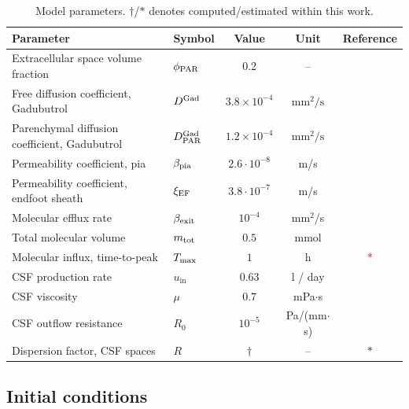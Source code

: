 \documentclass[fleqn,10pt]{wlscirep}
\newcommand{\fixme}[1]{\textcolor{red}{#1}}
\begin{document}
\begin{table}
  \begin{center}
    \begin{tabular}{ll|ccc}
      \toprule
      Parameter& Symbol & Value & Unit& Reference\\
      \midrule
      Extracellular space volume fraction & $\phi_{\rm PAR}$ & 0.2 & -- & \cite{nicholson1981ion} \\
      Free diffusion coefficient, Gadubutrol & $D^{\rm Gad}$ & $3.8 \times 10^{-4}$& $\text{mm}^2/\text{s}$ & \cite{valnes2020apparent}\\
      Parenchymal diffusion coefficient, Gadubutrol & $D^{\rm Gad}_{\rm PAR}$ & $1.2 \times 10^{-4}$ & $\text{mm}^2/\text{s}$  & \cite{hornkjol2022csf} \\
      Permeability coefficient, pia & $\beta_{\rm pia}$ & $2.6 \cdot 10^{-8}$ & m/s & \cite{riseth2025twocompartment} \\
      Permeability coefficient, endfoot sheath & $\xi_{\rm EF}$ & $3.8\cdot 10^{-7}$  & m/s & \cite{koch2023estimates} \\
      Molecular efflux rate & $\beta_{\rm exit}$ & $10^{-4}$ & mm$^2$/s & \cite{hornkjol2022csf} \\
      Total molecular volume & $m_{\rm tot}$ & $0.5$ & mmol & \cite{eide2024functional} \\
      Molecular influx, time-to-peak & $T_{\rm max}$ & $1$ & h & \fixme{$\ast$} \\
      CSF production rate & $u_{\mathrm{in}}$ & $0.63$  & l / day & \cite{nilsson1992circadian} \\
      CSF viscosity & $\mu$ & $0.7$ & mPa$ \cdot $s & \cite{bloomfield1998effects} \\ 
      CSF outflow resistance & $R_0$ & $10^{-5}$  & Pa/(mm$\cdot$s) & \cite{hornkjol2022csf} \\ 
      Dispersion factor, CSF spaces & $R$ & $\dagger$ & -- & $\ast$ \\
      \bottomrule
    \end{tabular}
  \end{center}
  \caption{Model parameters. $\dagger$/$\ast$ denotes computed/estimated within this work.}
  \label{tab:parameters}
\end{table}

\subsection*{Initial conditions}
\end{document}
